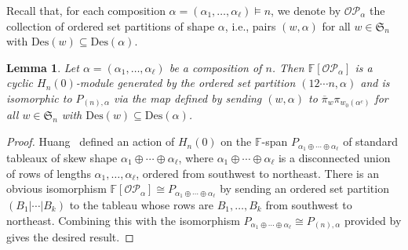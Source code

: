 \documentclass[10pt]{amsart}
\newtheorem{lemma}[theorem]{Lemma}
\theoremstyle{definition}
\newcommand{\Des}{{\mathrm {Des}}}
\newcommand{\symm}{{\mathfrak{S}}}
\newcommand{\OP}{{\mathcal{OP}}}
\newcommand{\FF}{{\mathbb{F}}}
\newcommand{\pib}{\overline{\pi}}
\begin{document}


Recall that, for each composition $\alpha=(\alpha_1,\ldots,\alpha_\ell) \models n$, we denote by $\OP_{\alpha}$ the collection of ordered set partitions of shape $\alpha$, i.e., pairs $(w,\alpha)$ for all $w\in\symm_n$ with $\Des(w)\subseteq \Des(\alpha)$.

\begin{lemma}
\label{osp-substructure}
Let $\alpha = (\alpha_1,\ldots,\alpha_\ell)$ be a composition of $n$. Then $\FF[\OP_\alpha]$ is a cyclic $H_n(0)$-module generated by the ordered set partition $(12\cdots n,\alpha)$ and is isomorphic to $P_{(n),\alpha}$ via the map defined by sending $(w,\alpha)$ to $\pib_w \pi_{w_0(\alpha^c)}$ for all $w\in\symm_n$ with $\Des(w)\subseteq \Des(\alpha)$.
\end{lemma}

\begin{proof}

Huang~\cite[(3.3)]{HuangTab} defined an action of $H_n(0)$ on the $\FF$-span $P_{\alpha_1\oplus\cdots\oplus\alpha_\ell}$ of standard tableaux of skew shape $\alpha_1\oplus\cdots\oplus\alpha_\ell$, where $\alpha_1\oplus\cdots\oplus\alpha_\ell$ is a disconnected union of rows of lengths $\alpha_1,\ldots,\alpha_\ell$, ordered from southwest to northeast. 
There is an obvious isomorphism $\FF[\OP_\alpha] \cong P_{\alpha_1\oplus\cdots\oplus\alpha_\ell}$ by sending an ordered set partition $(B_1|\cdots|B_k)$ to the tableau whose rows are $B_1,\ldots,B_k$ from southwest to northeast. 
Combining this with the isomorphism $P_{\alpha_1\oplus\cdots\oplus\alpha_\ell} \cong P_{(n),\alpha}$ provided by \cite[Thm. 3.3]{HuangTab} gives the desired result.
\end{proof}
\end{document}
